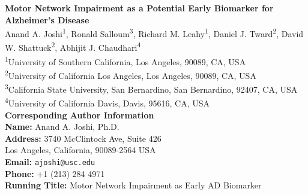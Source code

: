 \documentclass[review,3p,times,12pt,letterpaper]{elsarticle}
\begin{document}
\begin{frontmatter}
\begin{titlepage}
    \centering
    \Large\textbf{Motor Network Impairment as a Potential Early Biomarker for Alzheimer's Disease}\\[20pt]

    \large
    Anand A. Joshi\textsuperscript{1}, Ronald Salloum\textsuperscript{3}, Richard M. Leahy\textsuperscript{1}, Daniel J. Tward\textsuperscript{2}, David W. Shattuck\textsuperscript{2}, Abhijit J. Chaudhari\textsuperscript{4}  \\[10pt]

    \normalsize
    \textsuperscript{1}University of Southern California, Los Angeles, 90089, CA, USA\\
    \textsuperscript{2}University of California Los Angeles, Los Angeles, 90089, CA, USA\\
    \textsuperscript{3}California State University, San Bernardino, San Bernardino, 92407, CA, USA\\
    \textsuperscript{4}University of California Davis, Davis, 95616, CA, USA\\
    [30pt]

    \Large\textbf{Corresponding Author Information}\\[10pt]
    \large
    \textbf{Name:} Anand A. Joshi, Ph.D. \\
    \textbf{Address:} 3740 McClintock Ave, Suite 426 \\
    Los Angeles, California, 90089-2564 
    USA \\
    \textbf{Email:} \texttt{ajoshi@usc.edu} \\
    \textbf{Phone:} +1 (213) 284 4971\\[15pt]

\large
    \Large\textbf{Running Title:}
    \large
     Motor Network Impairment as Early AD Biomarker \\
    
\end{titlepage}





\end{frontmatter}
\end{document}
